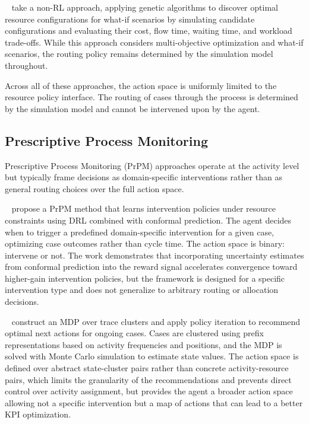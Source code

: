 \documentclass[journal,onecolumn]{IEEEtran}
\begin{document}
\citeauthor{genetic_resource_allocations}~\cite{genetic_resource_allocations}
take a non-RL approach, applying genetic algorithms to discover
optimal resource configurations for what-if scenarios by simulating
candidate configurations and evaluating their cost, flow time,
waiting time, and workload trade-offs. While this approach considers
multi-objective optimization and what-if scenarios, the routing
policy remains determined by the simulation model throughout.

Across all of these approaches, the action space is uniformly limited
to the resource policy interface. The routing of cases through the
process is determined by the simulation model and cannot be intervened
upon by the agent.

\subsection{Prescriptive Process Monitoring}
\label{subsec:soa_prpm}

Prescriptive Process Monitoring (PrPM) approaches operate at the
activity level but typically frame decisions as domain-specific
interventions rather than as general routing choices over the full
action space.

\citeauthor{ppm_resource_constraints}~\cite{ppm_resource_constraints}
propose a PrPM method that learns intervention policies under
resource constraints using DRL combined with conformal prediction.
The agent decides when to trigger a predefined domain-specific
intervention for a given case, optimizing case outcomes rather than
cycle time. The action space is binary: intervene or not. The work
demonstrates that incorporating uncertainty estimates from conformal
prediction into the reward signal accelerates convergence toward
higher-gain intervention policies, but the framework is designed
for a specific intervention type and does not generalize to arbitrary
routing or allocation decisions.

\citeauthor{ppm_optimal_policy_temporal_data}~\cite{ppm_optimal_policy_temporal_data}
construct an MDP over trace clusters and apply policy iteration to
recommend optimal next actions for ongoing cases. Cases are clustered
using prefix representations based on activity frequencies and
positions, and the MDP is solved with Monte Carlo simulation to
estimate state values. The action space is defined over abstract
state-cluster pairs rather than concrete activity-resource pairs,
which limits the granularity of the recommendations and prevents
direct control over activity assignment, but provides the agent
a broader action space allowing not a specific intervention but a map
of actions that can lead to a better KPI optimization.
\end{document}
